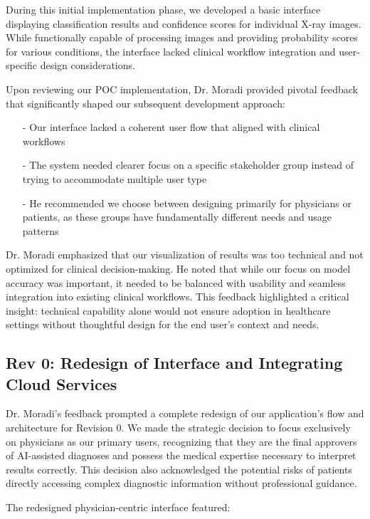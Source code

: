 \documentclass{article}
\begin{document}
\noindent During this initial implementation phase, we developed a basic interface displaying classification results and confidence scores for individual X-ray images. While functionally capable of processing images and providing probability scores for various conditions, the interface lacked clinical workflow integration and user-specific design considerations.

\noindent Upon reviewing our POC implementation, Dr. Moradi provided pivotal feedback that significantly shaped our subsequent development approach:

\begin{itemize}
    \item[-] Our interface lacked a coherent user flow that aligned with clinical workflows
    \item[-] The system needed clearer focus on a specific stakeholder group instead of trying to accommodate multiple user type
    \item[-] He recommended we choose between designing primarily for physicians or patients, as these groups have fundamentally different needs and usage patterns
\end{itemize}

\noindent Dr. Moradi emphasized that our visualization of results was too technical and not optimized for clinical decision-making. He noted that while our focus on model accuracy was important, it needed to be balanced with usability and seamless integration into existing clinical workflows. This feedback highlighted a critical insight: technical capability alone would not ensure adoption in healthcare settings without thoughtful design for the end user's context and needs.

\subsection{Rev 0: Redesign of Interface and Integrating Cloud Services}

Dr. Moradi's feedback prompted a complete redesign of our application's flow and architecture for Revision 0. We made the strategic decision to focus exclusively on physicians as our primary users, recognizing that they are the final approvers of AI-assisted diagnoses and possess the medical expertise necessary to interpret results correctly. This decision also acknowledged the potential risks of patients directly accessing complex diagnostic information without professional guidance.

\noindent The redesigned physician-centric interface featured:
\end{document}
